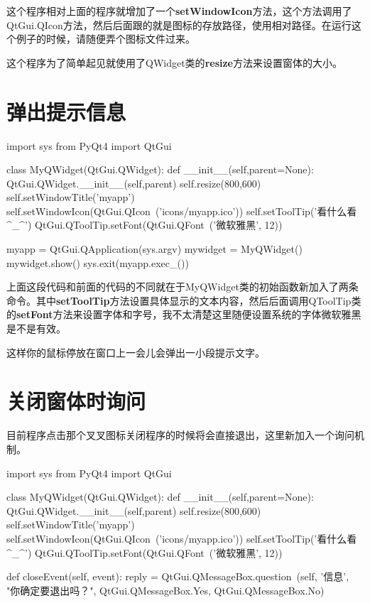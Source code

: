 \documentclass[12pt,oneside]{book}
\begin{document}
\begin{common-format}
这个程序相对上面的程序就增加了一个\textbf{setWindowIcon}方法，这个方法调用了QtGui.QIcon方法，然后后面跟的就是图标的存放路径，使用相对路径。在运行这个例子的时候，请随便弄个图标文件过来。

这个程序为了简单起见就使用了QWidget类的\textbf{resize}方法来设置窗体的大小。



\section{弹出提示信息}
\begin{tcbpython}
import sys
from PyQt4  import QtGui

class MyQWidget(QtGui.QWidget):
    def __init__(self,parent=None):
        QtGui.QWidget.__init__(self,parent)
        self.resize(800,600)
        self.setWindowTitle('myapp')
        self.setWindowIcon(QtGui.QIcon\
        ('icons/myapp.ico'))
        self.setToolTip('看什么看^_^')
        QtGui.QToolTip.setFont(QtGui.QFont\
        ('微软雅黑', 12))

myapp = QtGui.QApplication(sys.argv)
mywidget = MyQWidget()
mywidget.show()
sys.exit(myapp.exec_())
\end{tcbpython}



上面这段代码和前面的代码的不同就在于MyQWidget类的初始函数新加入了两条命令。其中\textbf{setToolTip}方法设置具体显示的文本内容，然后后面调用QToolTip类的\textbf{setFont}方法来设置字体和字号，我不太清楚这里随便设置系统的字体微软雅黑是不是有效。

这样你的鼠标停放在窗口上一会儿会弹出一小段提示文字。


\section{关闭窗体时询问}
目前程序点击那个叉叉图标关闭程序的时候将会直接退出，这里新加入一个询问机制。

\begin{tcbpython}
import sys
from PyQt4  import QtGui

class MyQWidget(QtGui.QWidget):
    def __init__(self,parent=None):
        QtGui.QWidget.__init__(self,parent)
        self.resize(800,600)
        self.setWindowTitle('myapp')
        self.setWindowIcon(QtGui.QIcon\
        ('icons/myapp.ico'))
        self.setToolTip('看什么看^_^')
        QtGui.QToolTip.setFont(QtGui.QFont\
        ('微软雅黑', 12))

    def closeEvent(self, event):
        reply = QtGui.QMessageBox.question\
        (self, '信息',
            "你确定要退出吗？",
             QtGui.QMessageBox.Yes,
             QtGui.QMessageBox.No)


\end{tcbpython}
\end{common-format}
\end{document}
